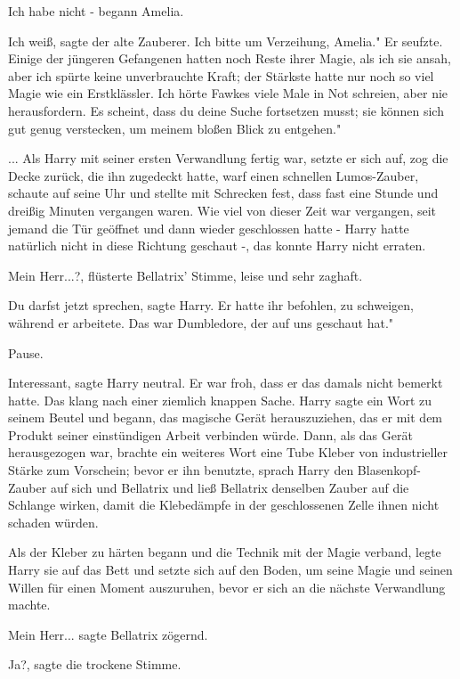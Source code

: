 \glqq{}Ich habe nicht -\grqq{} begann Amelia.

\glqq{}Ich weiß\grqq{}, sagte der alte Zauberer. \glqq{}Ich bitte um Verzeihung,
Amelia." Er seufzte. \glqq{}Einige der jüngeren Gefangenen hatten noch Reste
ihrer Magie, als ich sie ansah, aber ich spürte keine unverbrauchte Kraft; der
Stärkste hatte nur noch so viel Magie wie ein Erstklässler. Ich hörte Fawkes
viele Male in Not schreien, aber nie herausfordern. Es scheint, dass du deine
Suche fortsetzen musst; sie können sich gut genug verstecken, um meinem bloßen
Blick zu entgehen."

... Als Harry mit seiner ersten Verwandlung fertig war, setzte er sich auf, zog
die Decke zurück, die ihn zugedeckt hatte, warf einen schnellen Lumos-Zauber,
schaute auf seine Uhr und stellte mit Schrecken fest, dass fast eine Stunde und
dreißig Minuten vergangen waren. Wie viel von dieser Zeit war vergangen, seit
jemand die Tür geöffnet und dann wieder geschlossen hatte - Harry hatte
natürlich nicht in diese Richtung geschaut -, das konnte Harry nicht erraten.

\glqq{}Mein Herr...?\grqq{}, flüsterte Bellatrix' Stimme, leise und sehr zaghaft.

\glqq{}Du darfst jetzt sprechen\grqq{}, sagte Harry. Er hatte ihr befohlen, zu
schweigen, während er arbeitete. \glqq{}Das war Dumbledore, der auf uns geschaut
hat."

Pause.

\glqq{}Interessant\grqq{}, sagte Harry neutral. Er war froh, dass er das damals
nicht bemerkt hatte. Das klang nach einer ziemlich knappen Sache. Harry sagte
ein Wort zu seinem Beutel und begann, das magische Gerät herauszuziehen, das er
mit dem Produkt seiner einstündigen Arbeit verbinden würde. Dann, als das Gerät
herausgezogen war, brachte ein weiteres Wort eine Tube Kleber von industrieller
Stärke zum Vorschein; bevor er ihn benutzte, sprach Harry den Blasenkopf-Zauber
auf sich und Bellatrix und ließ Bellatrix denselben Zauber auf die Schlange
wirken, damit die Klebedämpfe in der geschlossenen Zelle ihnen nicht schaden
würden.

Als der Kleber zu härten begann und die Technik mit der Magie verband, legte
Harry sie auf das Bett und setzte sich auf den Boden, um seine Magie und seinen
Willen für einen Moment auszuruhen, bevor er sich an die nächste Verwandlung
machte.

\glqq{}Mein Herr...\grqq{} sagte Bellatrix zögernd.

\glqq{}Ja?\grqq{}, sagte die trockene Stimme.

